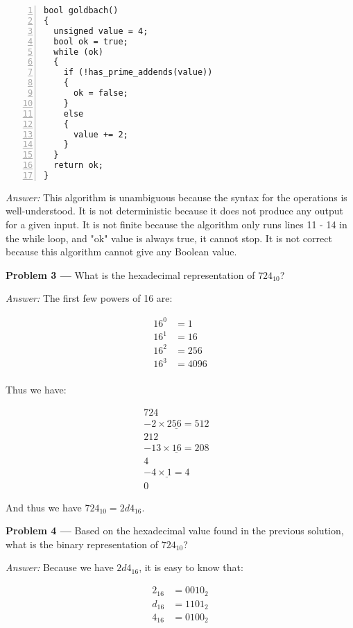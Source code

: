 \documentclass[11pt]{article}
\newcommand{\problem}[1]{\vspace*{2ex}\textbf{Problem #1 ---} }
\newcommand{\answer}{\textit{Answer: }}
\begin{document}
\begin{Verbatim}[numbers=left,xleftmargin=5mm]
bool goldbach()
{
  unsigned value = 4;
  bool ok = true;
  while (ok)
  {
    if (!has_prime_addends(value))
    {
      ok = false;
    }
    else
    {
      value += 2;
    }
  }
  return ok;
}
\end{Verbatim}

\answer This algorithm is unambiguous because the syntax for the
operations is well-understood. It is not deterministic because it does not
produce any output for a given input. It is not finite because the algorithm only runs lines 11 - 14 in the while loop, and  "ok" value is always true, it cannot stop. It is not correct because this algorithm cannot give any Boolean value.

\problem{3} What is the hexadecimal representation of $724_{10}$?

\answer The first few powers of 16 are:

\begin{align*}
16^0 &= 1\\
16^1 &= 16\\
16^2 &= 256\\
16^3 &= 4096\\
\end{align*}

Thus we have:

\begin{equation*}
\begin{split}
724&\\
\underline{-2 \times 256 = 512}&\\
212&\\
\underline{-13 \times 16 = 208}&\\
4&\\
\underline{-4 \times 1 = 4}&\\
0&
\end{split}
\end{equation*}

And thus we have $724_{10} = 2d4_{16}$.

\problem{4} Based on the hexadecimal value found in the previous
solution, what is the binary representation of $724_{10}$?

\answer Because we have $2d4_{16}$, it is easy to know that:

\begin{align*}
2_{16} &= 0010_{2}\\
d_{16} &= 1101_{2}\\
4_{16} &= 0100_{2}\\
\end{align*}
\end{document}
